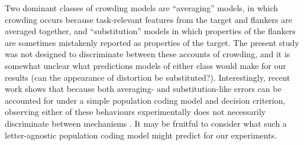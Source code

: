 \documentclass[doc, 11pt,a4paper,natbib]{apa6}\usepackage[]{graphicx}\usepackage[]{color}
\begin{document}
Two dominant classes of crowding models are ``averaging'' models, in which crowding occurs because task-relevant features from the target and flankers are averaged together, and ``substitution'' models in which properties of the flankers are sometimes mistakenly reported as properties of the target.
The present study was not designed to discriminate between these accounts of crowding, and it is somewhat unclear what predictions models of either class would make for our results (can the appearance of distortion be substituted?).
Interestingly, recent work shows that because both averaging- and substitution-like errors can be accounted for under a simple population coding model and decision criterion, observing either of these behaviours experimentally does not necessarily discriminate between mechanisms \citep[at least for orientation discrimination; ][]{harrison_unifying_2015}.
It may be fruitful to consider what such a letter-agnostic population coding model might predict for our experiments.
\end{document}
